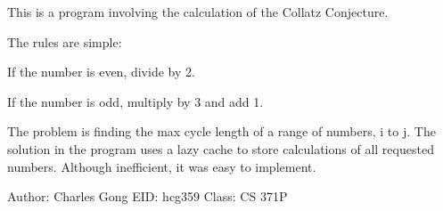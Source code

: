 This is a program involving the calculation of the Collatz Conjecture.

The rules are simple\-:
\begin{DoxyEnumerate}
\item If the number is even, divide by 2.
\item If the number is odd, multiply by 3 and add 1.
\end{DoxyEnumerate}

The problem is finding the max cycle length of a range of numbers, i to j. The solution in the program uses a lazy cache to store calculations of all requested numbers. Although inefficient, it was easy to implement.

Author\-: Charles Gong E\-I\-D\-: hcg359 Class\-: C\-S 371\-P 